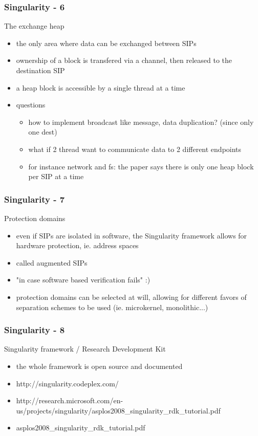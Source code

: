 \begin{frame}
  \frametitle{Singularity - 6}
  The exchange heap
 
 \begin{itemize}
   \item the only area where data can be exchanged between SIPs
   \item ownership of a block is transfered via a channel, then released to the destination SIP
   \item a heap block is accessible by a single thread at a time
   \item questions
     \begin{itemize}
       \item how to implement broadcast like message, data duplication? (since only one dest)
       \item what if 2 thread want to communicate data to 2 different endpoints
       \item for instance network and fs: the paper says there is only one heap block per SIP at a time
     \end{itemize}
 \end{itemize}
\end{frame}


\begin{frame}
  \frametitle{Singularity - 7}
  Protection domains
 
  \begin{itemize}
    \item even if SIPs are isolated in software, the Singularity framework allows for hardware protection, ie. address spaces
    \item called augmented SIPs
    \item "in case software based verification fails" :)
    \item protection domains can be selected at will, allowing for different favors of separation schemes to be used (ie. microkernel, monolithic...)
  \end{itemize}
\end{frame}


\begin{frame}
  \frametitle{Singularity - 8}
  Singularity framework / Research Development Kit
  \begin{itemize}
    \item the whole framework is open source and documented
    \item http://singularity.codeplex.com/
    \item http://research.microsoft.com/en-us/projects/singularity/asplos2008\_singularity\_rdk\_tutorial.pdf
    \item asplos2008\_singularity\_rdk\_tutorial.pdf
  \end{itemize}
\end{frame}


